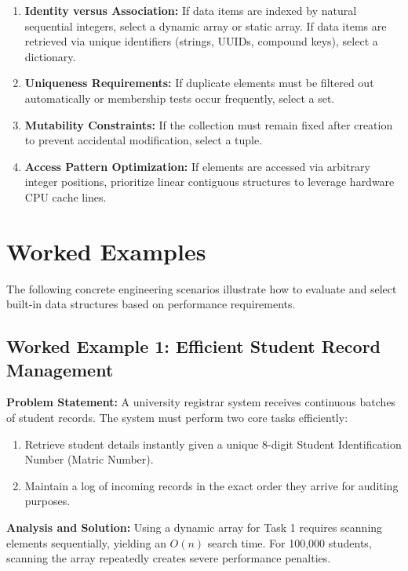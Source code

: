 \documentclass[12pt]{report}
\begin{document}
\begin{enumerate}
    \item \textbf{Identity versus Association:} If data items are indexed by natural sequential integers, select a dynamic array or static array. If data items are retrieved via unique identifiers (strings, UUIDs, compound keys), select a dictionary.
    \item \textbf{Uniqueness Requirements:} If duplicate elements must be filtered out automatically or membership tests occur frequently, select a set.
    \item \textbf{Mutability Constraints:} If the collection must remain fixed after creation to prevent accidental modification, select a tuple.
    \item \textbf{Access Pattern Optimization:} If elements are accessed via arbitrary integer positions, prioritize linear contiguous structures to leverage hardware CPU cache lines.
\end{enumerate}

\section{Worked Examples}

The following concrete engineering scenarios illustrate how to evaluate and select built-in data structures based on performance requirements.

\subsection{Worked Example 1: Efficient Student Record Management}

\textbf{Problem Statement:} A university registrar system receives continuous batches of student records. The system must perform two core tasks efficiently:
\begin{enumerate}
    \item Retrieve student details instantly given a unique 8-digit Student Identification Number (Matric Number).
    \item Maintain a log of incoming records in the exact order they arrive for auditing purposes.
\end{enumerate}

\textbf{Analysis and Solution:}
Using a dynamic array for Task 1 requires scanning elements sequentially, yielding an $O(n)$ search time. For 100,000 students, scanning the array repeatedly creates severe performance penalties.
\end{document}
